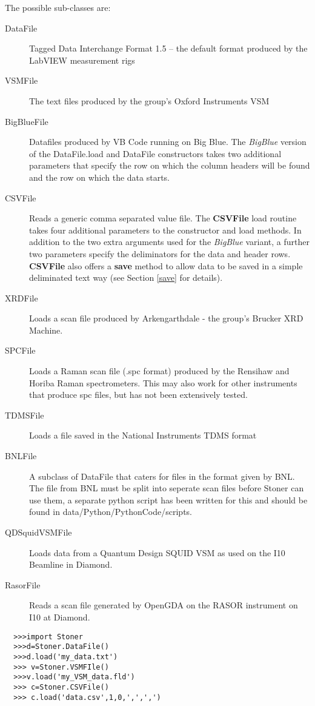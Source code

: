 \documentclass[a4paper,11pt]{scrartcl}
\begin{document}
The possible sub-classes are:
\begin{description}
\item[DataFile] Tagged Data Interchange Format 1.5 -- the default format produced by
the LabVIEW measurement rigs
\item[VSMFile] The text files produced by the group's Oxford Instruments VSM
\item[BigBlueFile] Datafiles produced by VB Code running on Big Blue. The
\textit{BigBlue} version of the DataFile.load and DataFile constructors takes
two additional parameters that specify the row on which the column headers will
be found and the row on which the data starts.
\item[CSVFile] Reads a generic comma separated value file. The \textbf{CSVFile} load
routine takes four additional parameters to the constructor and load methods. In
addition to the two extra arguments used for the \textit{BigBlue} variant, a
further two parameters specify the deliminators for the data and header rows. \textbf{CSVFile} also offers a \textbf{save} method to allow data to be saved in a simple deliminated text way (see Section \ref{save} for details).
\item[XRDFile] Loads a scan file produced by Arkengarthdale - the group's Brucker
XRD Machine.
\item[SPCFile] Loads a Raman scan file (.spc format) produced by the Rensihaw and Horiba
Raman spectrometers. This may also work for other instruments that produce spc files, but has not been extensively tested.
\item[TDMSFile] Loads a file saved in the National Instruments TDMS format

\item[BNLFile]   A subclass of DataFile that caters for files in the format given
    by BNL.  The file from BNL must be split into seperate scan files before Stoner can use
    them, a separate python script has been written for this and should be found
    in data/Python/PythonCode/scripts.
\item [QDSquidVSMFile] Loads data from a Quantum Design SQUID VSM as used on the I10 Beamline in Diamond.
\item [RasorFile] Reads a scan file generated by OpenGDA on the RASOR instrument on I10 at Diamond.
\end{description}

\begin{verbatim}
  >>>import Stoner
  >>>d=Stoner.DataFile()
  >>>d.load('my_data.txt')
  >>> v=Stoner.VSMFIle()
  >>>v.load('my_VSM_data.fld')
  >>> c=Stoner.CSVFile()
  >>> c.load('data.csv',1,0,',',',')
\end{verbatim}
\end{document}
